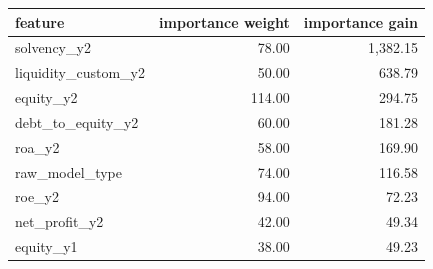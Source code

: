 \begin{tabular}{lrr} %
    \toprule
    \textbf{feature}      & \textbf{importance weight} & \textbf{importance gain} \\
    \midrule
    solvency\_y2          & 78.00                        & 1,382.15                   \\
    liquidity\_custom\_y2 & 50.00                        & 638.79                     \\
    equity\_y2            & 114.00                       & 294.75                     \\
    debt\_to\_equity\_y2  & 60.00                        & 181.28                     \\
    roa\_y2               & 58.00                        & 169.90                     \\
    raw\_model\_type      & 74.00                        & 116.58                     \\
    roe\_y2               & 94.00                        & 72.23                      \\
    net\_profit\_y2       & 42.00                        & 49.34                      \\
    equity\_y1            & 38.00                        & 49.23                      \\ %
    \bottomrule
\end{tabular}